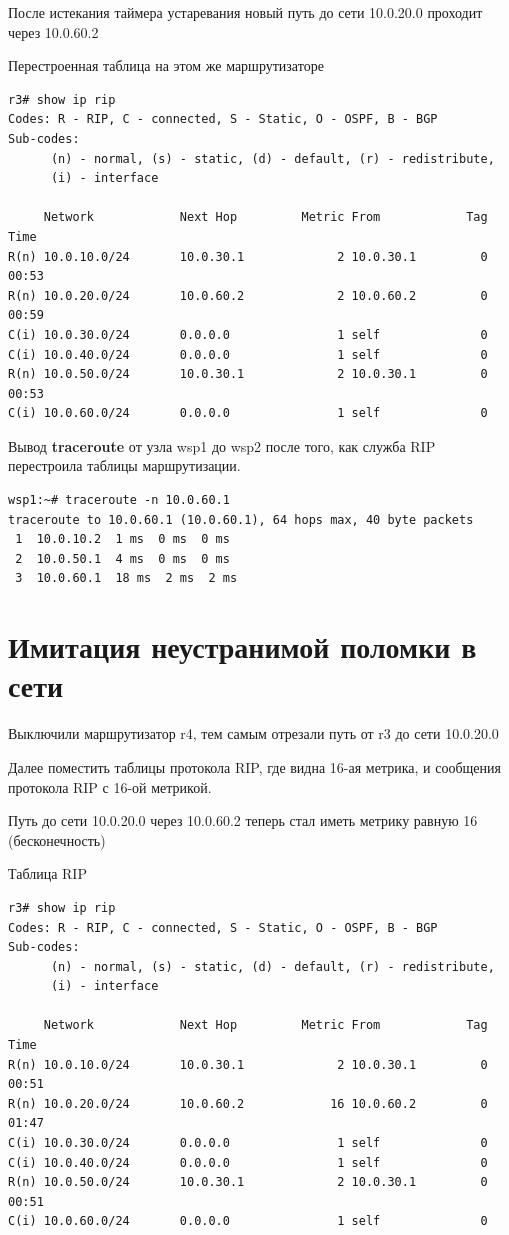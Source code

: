 \documentclass[a4paper,12pt]{article}
\begin{document}
После истекания таймера устаревания новый путь до сети 10.0.20.0 проходит через 10.0.60.2

Перестроенная таблица на этом же маршрутизаторе

\begin{Verbatim}
r3# show ip rip
Codes: R - RIP, C - connected, S - Static, O - OSPF, B - BGP
Sub-codes:
      (n) - normal, (s) - static, (d) - default, (r) - redistribute,
      (i) - interface

     Network            Next Hop         Metric From            Tag Time
R(n) 10.0.10.0/24       10.0.30.1             2 10.0.30.1         0 00:53
R(n) 10.0.20.0/24       10.0.60.2             2 10.0.60.2         0 00:59
C(i) 10.0.30.0/24       0.0.0.0               1 self              0
C(i) 10.0.40.0/24       0.0.0.0               1 self              0
R(n) 10.0.50.0/24       10.0.30.1             2 10.0.30.1         0 00:53
C(i) 10.0.60.0/24       0.0.0.0               1 self              0
\end{Verbatim}


Вывод \textbf{traceroute} от узла wsp1 до wsp2 после того, как служба RIP перестроила таблицы маршрутизации.

\begin{Verbatim}
wsp1:~# traceroute -n 10.0.60.1
traceroute to 10.0.60.1 (10.0.60.1), 64 hops max, 40 byte packets
 1  10.0.10.2  1 ms  0 ms  0 ms
 2  10.0.50.1  4 ms  0 ms  0 ms
 3  10.0.60.1  18 ms  2 ms  2 ms
\end{Verbatim}

\section{Имитация неустранимой поломки в сети}

Выключили маршрутизатор r4, тем самым отрезали путь от r3 до сети 10.0.20.0

Далее поместить таблицы протокола RIP, где видна 16-ая метрика, и сообщения протокола RIP с 16-ой метрикой.

Путь до сети 10.0.20.0 через 10.0.60.2 теперь стал иметь метрику равную 16 (бесконечность)

Таблица RIP

\begin{Verbatim}
r3# show ip rip
Codes: R - RIP, C - connected, S - Static, O - OSPF, B - BGP
Sub-codes:
      (n) - normal, (s) - static, (d) - default, (r) - redistribute,
      (i) - interface

     Network            Next Hop         Metric From            Tag Time
R(n) 10.0.10.0/24       10.0.30.1             2 10.0.30.1         0 00:51
R(n) 10.0.20.0/24       10.0.60.2            16 10.0.60.2         0 01:47
C(i) 10.0.30.0/24       0.0.0.0               1 self              0
C(i) 10.0.40.0/24       0.0.0.0               1 self              0
R(n) 10.0.50.0/24       10.0.30.1             2 10.0.30.1         0 00:51
C(i) 10.0.60.0/24       0.0.0.0               1 self              0
\end{Verbatim}
\end{document}
